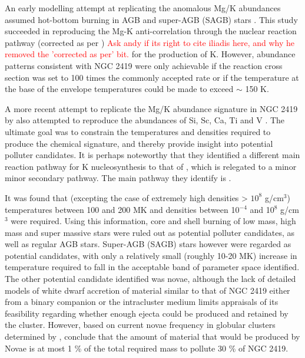 \documentclass[a4paper,fleqn,usenatbib]{mnras}
\newcommand{\todo}[1]{\textcolor{red}{#1}}
\begin{document}
An early modelling attempt at replicating the anomalous Mg/K abundances assumed hot-bottom burning in AGB and super-AGB (SAGB) stars \citep{ventura2012}. This study succeeded in reproducing the Mg-K anti-correlation through the nuclear reaction pathway  (corrected as per \cite{iliadis2016}) \todo{Ask andy if its right to cite iliadis here, and why he removed the 'corrected as per' bit.} for the production of K. However, abundance patterns consistent with NGC 2419 were only achievable if the reaction cross section was set to 100 times the commonly accepted rate or if the temperature at the base of the envelope  temperatures could be made to exceed $\sim$ 150 K.

A more recent attempt to replicate the Mg/K abundance signature in NGC 2419 by \cite{iliadis2016} also attempted to reproduce the abundances of Si, Sc, Ca, Ti and V  \citep[elements reported as having weak correlations with Mg by][]{cohenkirby2012}. The ultimate goal was to constrain the temperatures and densities required to produce the chemical signature, and thereby provide insight into potential polluter candidates. It is perhaps noteworthy that they identified a different main reaction pathway for K nucleosynthesis to that of \cite{ventura2012}, which is relegated to a minor minor secondary pathway. The main pathway they identify is . 


It was found that (excepting the case of extremely high densities > $10^8$ g/cm$^3$) temperatures between 100 and 200 MK and densities between 10$^{-4}$ and 10$^8$ g/cm$^3$ were required. Using this information, core and shell burning of low mass, high mass and super massive stars were ruled out as potential polluter candidates, as well as regular AGB stars. Super-AGB (SAGB) stars however were regarded as potential candidates, with only a relatively small (roughly 10-20 MK) increase in temperature required to fall in the acceptable band of parameter space identified. The other potential candidate identified was novae, although the lack of detailed models of white dwarf accretion of material similar to that of NGC 2419 either from a binary companion or the intracluster medium limits appraisals of its feasibility regarding whether enough ejecta could be produced and retained by the cluster. However, based on current novae frequency in globular clusters determined by \cite{kato2013novae}, \cite{iliadis2016} conclude that the amount of material that would be produced by Novae is at most 1 \% of the total required mass to pollute 30 \% of NGC 2419.
\end{document}
